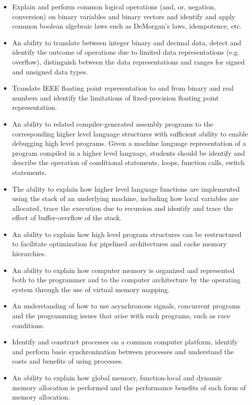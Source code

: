 {\begin{highlight}[\CSPBCompSys]
        \begin{itemize}
            \item Explain and perform common logical operations (and, or, negation, conversion) on binary variables and binary vectors and identify and apply common boolean algebraic laws such as DeMorgan’s laws, idempotence, etc.
            \item An ability to translate between integer binary and decimal data, detect and identify the outcome of operations due to limited data representations (e.g. overflow), distinguish between the data representations and ranges for signed and unsigned data types.
            \item Translate IEEE floating point representation to and from binary and real numbers and identify the limitations of fixed-precision floating point representation.
            \item An ability to related compiler-generated assembly programs to the corresponding higher level language structures with sufficient ability to enable debugging high level programs. Given a machine language representation of a program compiled in a higher level language, students should be identify and describe the operation of conditional statements, loops, function calls, switch statements.
            \item The ability to explain how higher level language functions are implemented using the stack of an underlying machine, including how local variables are allocated, trace the execution due to recursion and identify and trace the effect of buffer-overflow of the stack.
            \item An ability to explain how high level program structures can be restructured to facilitate optimization for pipelined architectures and cache memory hierarchies.
            \item An ability to explain how computer memory is organized and represented both to the programmer and to the computer architecture by the operating system through the use of virtual memory mapping.
            \item An understanding of how to use asynchronous signals, concurrent programs and the programming issues that arise with such programs, such as race conditions.
            \item Identify and construct processes on a common computer platform, identify and perform basic synchronization between processes and understand the costs and benefits of using processes.
            \item An ability to explain how global memory, function-local and dynamic memory allocation is performed and the performance benefits of each form of memory allocation.

\end{itemize}
\end{highlight}}
